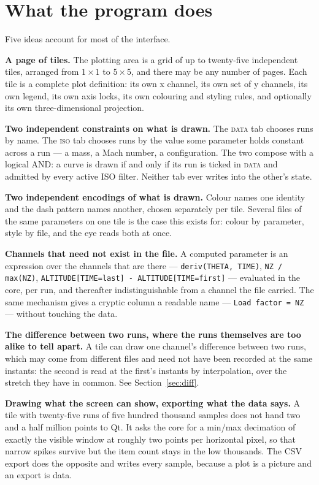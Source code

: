 \documentclass[11pt,a4paper,oneside]{report}
\newcommand{\code}[1]{\texttt{#1}}
\newcommand{\tab}[1]{\textsc{#1}}
\begin{document}
\section{What the program does}

Five ideas account for most of the interface.

\textbf{A page of tiles.} The plotting area is a grid of up to twenty-five
independent tiles, arranged from $1 \times 1$ to $5 \times 5$, and there may be
any number of pages. Each tile is a complete plot definition: its own x channel,
its own set of y channels, its own legend, its own axis locks, its own colouring
and styling rules, and optionally its own three-dimensional projection.

\textbf{Two independent constraints on what is drawn.} The \tab{data} tab
chooses runs by name. The \tab{iso} tab chooses runs by the value some parameter
holds constant across a run --- a mass, a Mach number, a configuration. The two
compose with a logical AND: a curve is drawn if and only if its run is ticked in
\tab{data} and admitted by every active ISO filter. Neither tab ever writes into
the other's state.

\textbf{Two independent encodings of what is drawn.} Colour names one identity
and the dash pattern names another, chosen separately per tile. Several files of
the same parameters on one tile is the case this exists for: colour by
parameter, style by file, and the eye reads both at once.

\textbf{Channels that need not exist in the file.} A computed parameter is an
expression over the channels that are there ---
\code{deriv(THETA, TIME)}, \code{NZ / max(NZ)},
\code{ALTITUDE[TIME=last] - ALTITUDE[TIME=first]} --- evaluated in the core,
per run, and thereafter indistinguishable from a channel the file carried. The
same mechanism gives a cryptic column a readable name --- \code{Load factor =
NZ} --- without touching the data.

\textbf{The difference between two runs, where the runs themselves are too
alike to tell apart.} A tile can draw one channel's difference between two runs,
which may come from different files and need not have been recorded at the same
instants: the second is read at the first's instants by interpolation, over the
stretch they have in common. See Section~\ref{sec:diff}.

\textbf{Drawing what the screen can show, exporting what the data says.} A tile
with twenty-five runs of five hundred thousand samples does not hand two and a
half million points to Qt. It asks the core for a min/max decimation of exactly
the visible window at roughly two points per horizontal pixel, so that narrow
spikes survive but the item count stays in the low thousands. The CSV export
does the opposite and writes every sample, because a plot is a picture and an
export is data.
\end{document}
